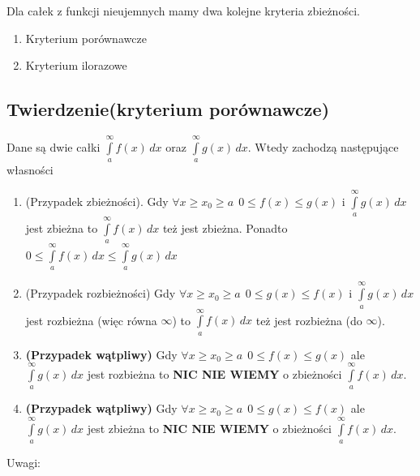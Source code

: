 Dla całek z funkcji nieujemnych mamy dwa kolejne kryteria zbieżności.

\begin{enumerate}
    \item Kryterium porównawcze
    \item Kryterium ilorazowe
\end{enumerate}


\subsection*{Twierdzenie(kryterium porównawcze)}

Dane są dwie całki $ \int\limits_{a}^{\infty} f(x) \,dx $ oraz
$ \int\limits_{a}^{\infty} g(x) \, dx $. Wtedy zachodzą następujące własności

\begin{enumerate}
    \item (Przypadek zbieżności). Gdy $ \forall x \geq x_0 \geq a \ \ 0 \leq f(x) \leq g(x) $ i $ \int\limits_{a}^{\infty} g(x) \,dx $
    jest zbieżna to $ \int\limits_{a}^{\infty} f(x) \,dx $ też jest zbieżna. Ponadto \
    $ 0 \leq \int\limits_{a}^{\infty} f(x) \,dx \leq \int\limits_{a}^{\infty} g(x) \,dx $
    
    \item (Przypadek rozbieżności) Gdy $ \forall x \geq x_0 \geq a \ \ 0 \leq g(x) \leq f(x) $ i $ \int\limits_{a}^{\infty} g(x) \,dx $
    jest rozbieżna (więc równa $\infty$) to $ \int\limits_{a}^{\infty} f(x) \,dx $ też jest rozbieżna (do $\infty$).
    
    \item \textbf{(Przypadek wątpliwy)} Gdy $ \forall x \geq x_0 \geq a \ \ 0 \leq f(x) \leq g(x) $ ale $ \int\limits_{a}^{\infty} g(x) \,dx $
    jest rozbieżna to \textbf{NIC NIE WIEMY} o zbieżności $ \int\limits_{a}^{\infty} f(x) \,dx $.
    
    \item \textbf{(Przypadek wątpliwy)} Gdy $ \forall x \geq x_0 \geq a \ \ 0 \leq g(x) \leq f(x) $ ale $ \int\limits_{a}^{\infty} g(x) \,dx $
    jest zbieżna to \textbf{NIC NIE WIEMY} o zbieżności $ \int\limits_{a}^{\infty} f(x) \,dx $.
\end{enumerate}

Uwagi:


